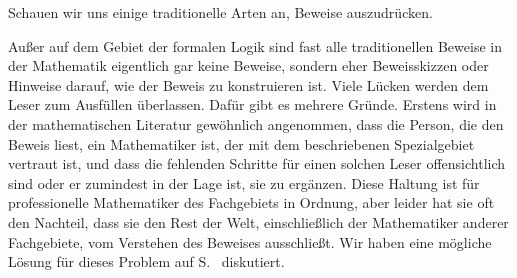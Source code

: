 Schauen wir uns einige traditionelle Arten an, Beweise auszudrücken.

Außer auf dem Gebiet der formalen Logik sind fast alle traditionellen Beweise in der Mathematik eigentlich gar keine Beweise, sondern eher Beweisskizzen oder Hinweise darauf, wie der Beweis zu konstruieren ist.  Viele Lücken werden dem Leser zum Ausfüllen überlassen. Dafür gibt es mehrere Gründe.  Erstens wird in der mathematischen Literatur gewöhnlich angenommen, dass die Person, die den Beweis liest, ein Mathematiker ist, der mit dem beschriebenen Spezialgebiet vertraut ist, und dass die fehlenden Schritte für einen solchen Leser offensichtlich sind oder er zumindest in der Lage ist, sie zu ergänzen.
Diese Haltung ist für professionelle Mathematiker des Fachgebiets in Ordnung, aber leider hat sie oft den Nachteil, dass sie den Rest der Welt, einschließlich der Mathematiker anderer Fachgebiete, vom Verstehen des Beweises ausschließt.
Wir haben eine mögliche Lösung für dieses Problem auf S.~\pageref{envision} diskutiert.
